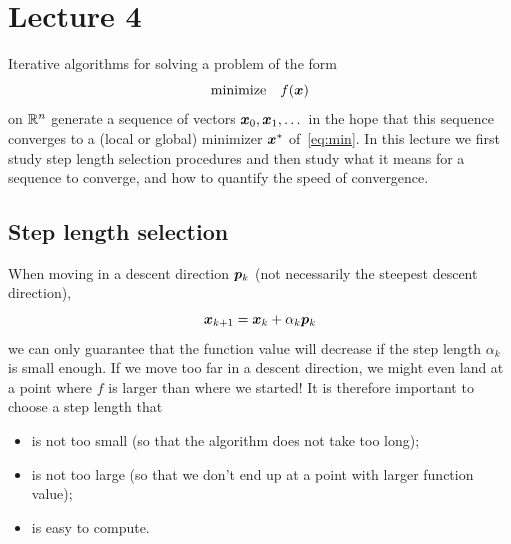 %
%
% 


\chapter*{Lecture 4}
\addtocounter{chapter}{4}
\addtocounter{section}{0}


Iterative algorithms for solving a problem of the form
\begin{equation}\label{eq:min}
 \text{minimize}\quad f(\bm{x})
\end{equation}
on $\mathbb{R}^n$ generate a sequence of vectors $\bm{x}_0,\bm{x}_1,\dots$ in the hope that this sequence converges to a (local or global) minimizer $\bm{x}^*$ of~\eqref{eq:min}. In this lecture we first study step length selection procedures and then study what it means for a sequence to converge, and how to quantify the speed of convergence.

\section{Step length selection}\label{sec:steplength}
When moving in a descent direction $\bm{p}_k$ (not necessarily the steepest descent direction), 
\begin{equation*}
  \bm{x}_{k+1} = \bm{x}_k+\alpha_k \bm{p}_k
\end{equation*}
we can only guarantee that the function value will decrease if the step length $\alpha_k$ is small enough. If we move too far in a descent direction, we might even land at a point where $f$ is larger than where we started! It is therefore important to choose a step length that 
\begin{itemize}
\item is not too small (so that the algorithm does not take too long);
\item is not too large (so that we don't end up at a point with larger function value);
\item is easy to compute.
\end{itemize} 

